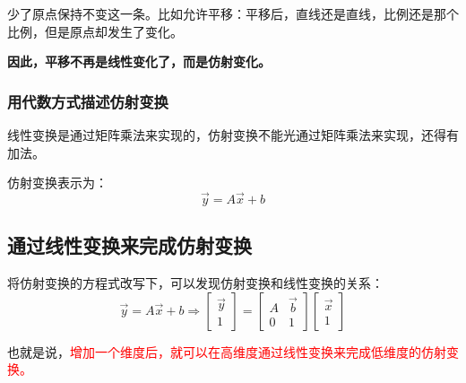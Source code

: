 \documentclass[12pt]{article}
\begin{document}
少了原点保持不变这一条。比如允许平移：平移后，直线还是直线，比例还是那个比例，但是原点却发生了变化。

\textbf{因此，平移不再是线性变化了，而是仿射变化。}

\subsubsection{用代数方式描述仿射变换}
线性变换是通过矩阵乘法来实现的，仿射变换不能光通过矩阵乘法来实现，还得有加法。

仿射变换表示为：
$$
\vec{y} = A\vec{x} + b
$$

\subsection{通过线性变换来完成仿射变换}
将仿射变换的方程式改写下，可以发现仿射变换和线性变换的关系：
$$
\vec{y} = A\vec{x} + b \Rightarrow 
\begin{bmatrix}
    \vec{y}\\1
\end{bmatrix} = 
\begin{bmatrix}
    A & \vec{b}\\0 & 1
\end{bmatrix}
\begin{bmatrix}
    \vec{x}\\1
\end{bmatrix}
$$

也就是说，\textcolor{red}{增加一个维度后，就可以在高维度通过线性变换来完成低维度的仿射变换。}
\end{document}
